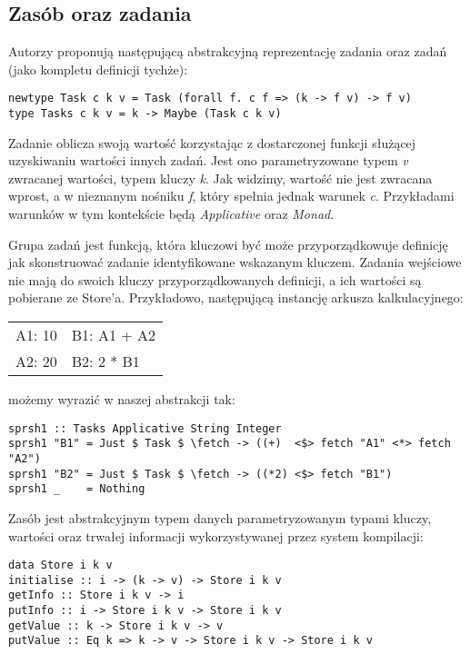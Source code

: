 \subsection{Zasób oraz zadania}

\lstset{style=haskell-style}

Autorzy proponują następującą abstrakcyjną reprezentację zadania oraz zadań (jako kompletu definicji tychże):

\begin{lstlisting}
newtype Task c k v = Task (forall f. c f => (k -> f v) -> f v)
type Tasks c k v = k -> Maybe (Task c k v)
\end{lstlisting}

Zadanie oblicza swoją wartość korzystając z dostarczonej funkcji służącej uzyskiwaniu wartości innych zadań. Jest ono parametryzowane typem \textit{v} zwracanej wartości, typem kluczy \textit{k}. Jak widzimy, wartość nie jest zwracana wprost, a w nieznanym nośniku \textit{f}, który spełnia jednak warunek \textit{c}. Przykładami warunków w tym kontekście będą \textit{Applicative} oraz \textit{Monad}.

Grupa zadań jest funkcją, która kluczowi być może przyporządkowuje definicję jak skonstruować zadanie identyfikowane wskazanym kluczem. Zadania wejściowe nie mają do swoich kluczy przyporządkowanych definicji, a ich wartości są pobierane ze Store'a. Przykładowo, następującą instancję arkusza kalkulacyjnego:

\begin{tabular}{ l l }
  A1: 10 & B1: A1 + A2 \\
  A2: 20 & B2: 2 * B1
\end{tabular}

możemy wyrazić w naszej abstrakcji tak:

\begin{lstlisting}
sprsh1 :: Tasks Applicative String Integer
sprsh1 "B1" = Just $ Task $ \fetch -> ((+)  <$> fetch "A1" <*> fetch "A2")
sprsh1 "B2" = Just $ Task $ \fetch -> ((*2) <$> fetch "B1")
sprsh1 _    = Nothing
\end{lstlisting}

Zasób jest abstrakcyjnym typem danych parametryzowanym typami kluczy, wartości oraz trwałej informacji wykorzystywanej przez system kompilacji:

\begin{lstlisting}
data Store i k v
initialise :: i -> (k -> v) -> Store i k v
getInfo :: Store i k v -> i
putInfo :: i -> Store i k v -> Store i k v
getValue :: k -> Store i k v -> v
putValue :: Eq k => k -> v -> Store i k v -> Store i k v
\end{lstlisting}

